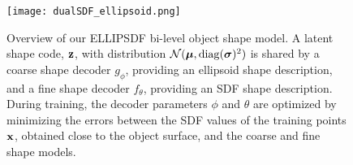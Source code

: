 





\begin{figure}[t]
    \centering
    \texttt{[image: dualSDF\_ellipsoid.png]}
    \caption{Overview of our ELLIPSDF bi-level object shape model. A latent shape code, $\mathbf{z}$, with distribution ${\cal N}(\boldsymbol{\mu},\operatorname{diag}(\boldsymbol{\sigma})^2)$ is shared by a coarse shape decoder $g_\phi$, providing an ellipsoid shape description, and a fine shape decoder $f_\theta$, providing an SDF shape description. During training, the decoder parameters $\phi$ and $\theta$ are optimized by minimizing the errors between the SDF values of the training points $\mathbf{x}$, obtained close to the object surface, and the coarse and fine shape models.}
    \label{fig:two_level_model}
\end{figure}











